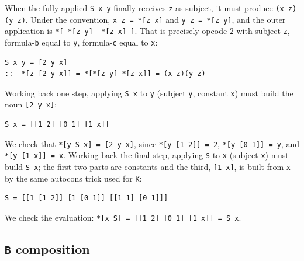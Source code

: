 \documentclass[twoside]{article}
\begin{document}
When the fully-applied \lstinline[style=inlinecode]{S x y} finally receives \lstinline[style=inlinecode]{z} as subject, it must produce \lstinline[style=inlinecode]{(x z)(y z)}.  Under the convention, \lstinline[style=inlinecode]{x z = *[z x]} and \lstinline[style=inlinecode]{y z = *[z y]}, and the outer application is \lstinline[style=inlinecode]{*[ *[z y]  *[z x] ]}.  That is precisely opcode 2 with subject \lstinline[style=inlinecode]{z}, formula-\lstinline[style=inlinecode]{b} equal to \lstinline[style=inlinecode]{y}, formula-\lstinline[style=inlinecode]{c} equal to \lstinline[style=inlinecode]{x}:

\begin{lstlisting}[style=listingblock]
S x y = [2 y x]
::  *[z [2 y x]] = *[*[z y] *[z x]] = (x z)(y z)
\end{lstlisting}

\noindent
Working back one step, applying \lstinline[style=inlinecode]{S x} to \lstinline[style=inlinecode]{y} (subject \lstinline[style=inlinecode]{y}, constant \lstinline[style=inlinecode]{x}) must build the noun \lstinline[style=inlinecode]{[2 y x]}:

\begin{lstlisting}[style=listingblock]
S x = [[1 2] [0 1] [1 x]]
\end{lstlisting}

\noindent
We check that \lstinline[style=inlinecode]{*[y S x] = [2 y x]}, since \lstinline[style=inlinecode]{*[y [1 2]] = 2}, \lstinline[style=inlinecode]{*[y [0 1]] = y}, and \lstinline[style=inlinecode]{*[y [1 x]] = x}.  Working back the final step, applying \lstinline[style=inlinecode]{S} to \lstinline[style=inlinecode]{x} (subject \lstinline[style=inlinecode]{x}) must build \lstinline[style=inlinecode]{S x}; the first two parts are constants and the third, \lstinline[style=inlinecode]{[1 x]}, is built from \lstinline[style=inlinecode]{x} by the same autocons trick used for \lstinline[style=inlinecode]{K}:

\begin{lstlisting}[style=listingblock]
S = [[1 [1 2]] [1 [0 1]] [[1 1] [0 1]]]
\end{lstlisting}

\noindent
We check the evaluation:  \lstinline[style=inlinecode]{*[x S] = [[1 2] [0 1] [1 x]] = S x}.

\subsection{\texttt{B} composition}
\end{document}
